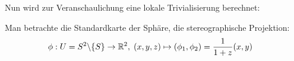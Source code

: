 \documentclass[../H_Analysis_main.tex]{subfiles}
\begin{document}
Nun wird zur Veranschaulichung eine lokale Trivialisierung berechnet:
\begin{bsp}
Man betrachte die Standardkarte der Sphäre, die stereographische Projektion:
\begin{align*}
\phi&: U = S^2 \backslash \qty{S} \rightarrow \mathbb{R}^2, \; (x, y, z) \mapsto (\phi_1, \phi_2) = \frac{1}{1 + z} (x, y)
\end{align*}





\end{bsp}
\end{document}
